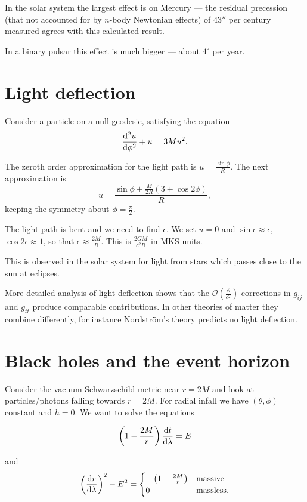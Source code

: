 \documentclass{notes}
\newcommand{\cO}{\mathcal{O}}
\begin{document}
In the solar system the largest effect is on Mercury --- the residual
precession (that not accounted for by $n$-body Newtonian effects) 
of $43''$ per century measured agrees with this calculated result.

In a binary pulsar this effect is much bigger --- about
$4^\circ$ per year.

\section{Light deflection}

Consider a particle on a null geodesic, satisfying the equation
\[
\frac{\mathrm{d}^2 u}{\mathrm{d}\phi^2} + u = 3 M u^2.
\]

\vspace{1.5in}

The zeroth order approximation for the light path is
$u = \frac{\sin \phi}{R}$.  The next approximation is
\[
u = \frac{\sin \phi + \tfrac{M}{2 R} (3 +\cos 2 \phi)}{R},
\]
keeping the symmetry about $\phi = \tfrac{\pi}{2}$.

The light path is bent and we need to find $\epsilon$.  We set $u = 0$
and $\sin \epsilon \approx \epsilon$, $\cos 2 \epsilon \approx 1$, so
that $\epsilon \approx \tfrac{2 M}{R}$.  This is
$\tfrac{2 G M}{c^2 R}$ in MKS units.

This is observed in the solar system for light from stars which passes
close to the sun at eclipses.

More detailed analysis of light deflection shows that the
$\cO(\tfrac{\phi}{c^2})$ corrections in $g_{ij}$ and $g_{tt}$
produce comparable contributions.  In other theories of matter
they combine differently, for instance Nordstr\"om's theory
predicts no light deflection.

\section{Black holes and the event horizon}

Consider the vacuum Schwarzschild metric near $r=2 M$ and look at
particles/photons falling towards $r = 2M$.  For radial infall we have
$(\theta,\phi)$ constant and $h=0$.  We want to solve the equations

\[
\left( 1- \frac{2 M}{r} \right) \frac{\mathrm{d} t}{\mathrm{d}\lambda} = E
\]

and
\[
\left( \frac{\mathrm{d} r}{\mathrm{d}\lambda} \right)^2 - E^2 = \begin{cases}
- \left( 1 - \frac{2 M}{r} \right) & \text{massive} \\
0 & \text{massless.}
\end{cases}
\]
\end{document}
